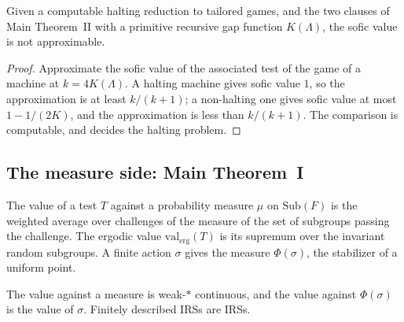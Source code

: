 \begin{theorem}
\label{thm:sofic-not-approximable}
\leanok
Given a computable halting reduction to tailored games, and the two clauses of Main Theorem~II
with a primitive recursive gap function $K(\Lambda)$, the sofic value is not approximable.
\end{theorem}

\begin{proof}
\leanok
Approximate the sofic value of the associated test of the game of a machine at $k = 4K(\Lambda)$.
A halting machine gives sofic value $1$, so the approximation is at least $k/(k+1)$; a
non-halting one gives sofic value at most $1 - 1/(2K)$, and the approximation is less than
$k/(k+1)$. The comparison is computable, and decides the halting problem.
\end{proof}

\subsection{The measure side: Main Theorem~I}

\begin{definition}
\label{def:erg-value}
\leanok
The value of a test $T$ against a probability measure $\mu$ on $\mathrm{Sub}(F)$ is the weighted
average over challenges of the measure of the set of subgroups passing the challenge. The
ergodic value $\mathrm{val}_{\mathrm{erg}}(T)$ is its supremum over the invariant random
subgroups. A finite action $\sigma$ gives the measure $\Phi(\sigma)$, the stabilizer of a uniform
point.
\end{definition}

\begin{lemma}
\label{lem:val-on-continuous}
\leanok
The value against a measure is weak-$*$ continuous, and the value against $\Phi(\sigma)$ is the
value of $\sigma$. Finitely described IRSs are IRSs.
\end{lemma}

